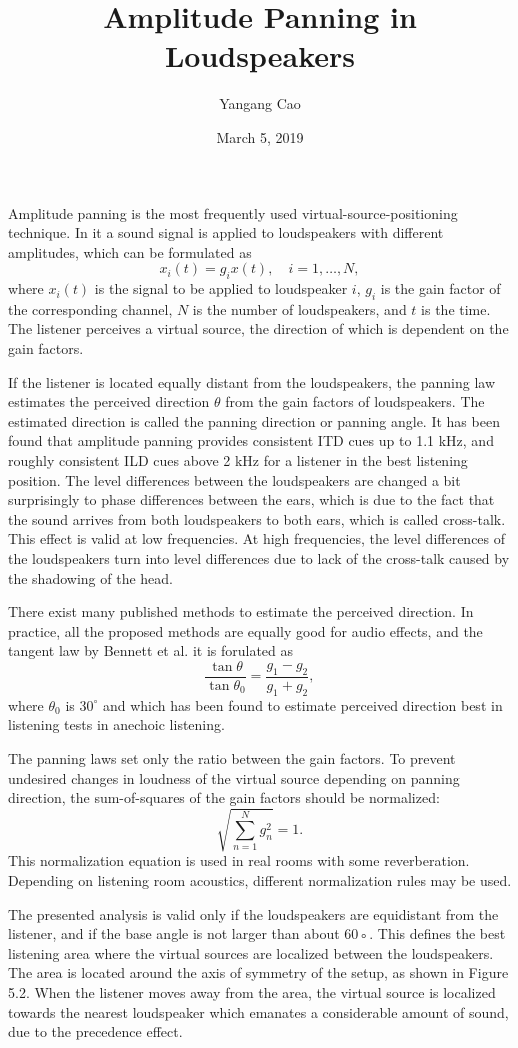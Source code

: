 \documentclass[10pt,a4paper,oneside]{article}
\author{Yangang Cao}
\date{March 5, 2019}
\begin{document}
\title{Amplitude Panning in Loudspeakers}
\maketitle 
Amplitude panning is the most frequently used virtual-source-positioning technique. In it a sound signal is applied to loudspeakers with different amplitudes, which can be formulated as
\[
x_{i}(t)=g_{i} x(t), \quad i=1, \ldots, N,
\]
where $x_i(t)$ is the signal to be applied to loudspeaker $i$, $g_i$ is the gain factor of the corresponding channel, $N$ is the number of loudspeakers, and $t$ is the time. The listener perceives a virtual source, the direction of which is dependent on the gain factors.

If the listener is located equally distant from the loudspeakers, the panning law estimates the perceived direction $\theta$ from the gain factors of loudspeakers. The estimated direction is called the panning direction or panning angle. It has been found that amplitude panning provides consistent ITD cues up to 1.1 kHz, and roughly consistent ILD cues above 2 kHz for a listener in the best listening position. The level differences between the loudspeakers are changed a bit surprisingly to phase differences between the ears, which is due to the fact that the sound arrives from both loudspeakers to both ears, which is called cross-talk. This effect is valid at low frequencies. At high frequencies, the level differences of the loudspeakers turn into level differences due to lack of the cross-talk caused by the shadowing of the head.

There exist many published methods to estimate the perceived direction. In practice, all the proposed methods are equally good for audio effects, and the tangent law by Bennett et al. it is forulated as
\[
\frac{\tan \theta}{\tan \theta_{0}}=\frac{g_{1}-g_{2}}{g_{1}+g_{2}},
\]
where $\theta_{0}$ is $30^{\circ}$ and which has been found to estimate perceived direction best in listening tests in anechoic listening.

The panning laws set only the ratio between the gain factors. To prevent undesired changes in loudness of the virtual source depending on panning direction, the sum-of-squares of the gain
factors should be normalized:
\[
\sqrt{\sum_{n=1}^{N} g_{n}^{2}}=1.
\]
This normalization equation is used in real rooms with some reverberation. Depending on listening room acoustics, different normalization rules may be used.

The presented analysis is valid only if the loudspeakers are equidistant from the listener, and if the base angle is not larger than about 60◦. This defines the best listening area where the virtual sources are localized between the loudspeakers. The area is located around the axis of symmetry of the setup, as shown in Figure 5.2. When the listener moves away from the area, the virtual source is localized towards the nearest loudspeaker which emanates a considerable amount of sound, due to the precedence effect.
\end{document}
